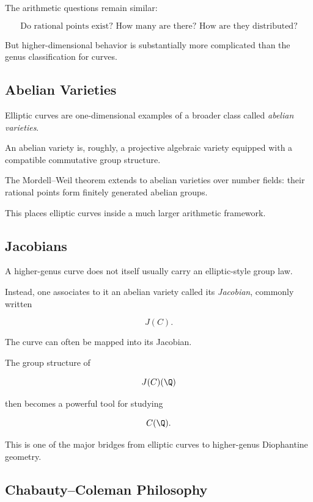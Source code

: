 The arithmetic questions remain similar:

\[
\boxed{
\text{Do rational points exist? How many are there? How are they distributed?}
}
\]

But higher-dimensional behavior is substantially more complicated than the
genus classification for curves.

\subsection{Abelian Varieties}
\label{subsec:abelian-varieties-preview}

Elliptic curves are one-dimensional examples of a broader class called
\emph{abelian varieties}.

An abelian variety is, roughly, a projective algebraic variety equipped with
a compatible commutative group structure.

The Mordell--Weil theorem extends to abelian varieties over number fields:
their rational points form finitely generated abelian groups.

This places elliptic curves inside a much larger arithmetic framework.

\subsection{Jacobians}
\label{subsec:jacobians-preview}

A higher-genus curve does not itself usually carry an elliptic-style group
law.

Instead, one associates to it an abelian variety called its \emph{Jacobian},
commonly written

\[ J(C). \]

The curve can often be mapped into its Jacobian.

The group structure of

\[ J(C)(\Q) \]

then becomes a powerful tool for studying

\[ C(\Q). \]

This is one of the major bridges from elliptic curves to higher-genus
Diophantine geometry.

\subsection{Chabauty--Coleman Philosophy}
\label{subsec:chabauty-coleman-preview}

